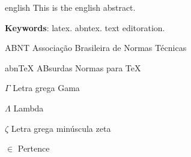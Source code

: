 \documentclass[
	12pt,			%
	openany,			%
	oneside,			%
	a4paper,			%
	english,			%
	french,				%
	spanish,			%
	brazil				%
	]{abntex2}
\newcommand{\listofquadrosname}{Lista de quadros}
\begin{document}
\begin{resumo}[Abstract]
 \begin{otherlanguage*}{english}
   This is the english abstract.

   \vspace{\onelineskip}
 
   \noindent 
   \textbf{Keywords}: latex. abntex. text editoration.
 \end{otherlanguage*}
\end{resumo}

 

  

\listoffigures*
\cleardoublepage


\listoftables*
\cleardoublepage

\begin{siglas}
  \item[ABNT] Associação Brasileira de Normas Técnicas
  \item[abnTeX] ABsurdas Normas para TeX
\end{siglas}

\begin{simbolos}
  \item[$ \Gamma $] Letra grega Gama
  \item[$ \Lambda $] Lambda
  \item[$ \zeta $] Letra grega minúscula zeta
  \item[$ \in $] Pertence
\end{simbolos}
\end{document}
